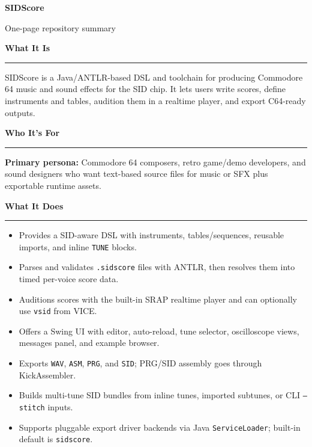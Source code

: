 \documentclass[11pt,a4paper]{article}
\newenvironment{tightitemize}
  {\begin{itemize}\setlength{\itemsep}{2pt}\setlength{\parskip}{0pt}\setlength{\parsep}{0pt}\setlength{\topsep}{2pt}}
  {\end{itemize}}
\newcommand{\sectiontitle}[1]{%
  {\color{MidnightBlue}\large\bfseries #1\par}%
  {\color{MidnightBlue}\rule{\linewidth}{0.8pt}\par}%
  \vspace{2pt}%
}
\begin{document}
\raggedright

{\fontsize{22}{25}\selectfont\bfseries SIDScore\par}
{\color{Gray}\large One-page repository summary\par}
\vspace{6pt}

\sectiontitle{What It Is}
SIDScore is a Java/ANTLR-based DSL and toolchain for producing Commodore 64 music and sound effects for the SID chip. It lets users write scores, define instruments and tables, audition them in a realtime player, and export C64-ready outputs.

\begin{minipage}[t]{0.49\linewidth}
\sectiontitle{Who It's For}
\textbf{Primary persona:} Commodore 64 composers, retro game/demo developers, and sound designers who want text-based source files for music or SFX plus exportable runtime assets.

\sectiontitle{What It Does}
\begin{tightitemize}
\item Provides a SID-aware DSL with instruments, tables/sequences, reusable imports, and inline \texttt{TUNE} blocks.
\item Parses and validates \texttt{.sidscore} files with ANTLR, then resolves them into timed per-voice score data.
\item Auditions scores with the built-in SRAP realtime player and can optionally use \texttt{vsid} from VICE.
\item Offers a Swing UI with editor, auto-reload, tune selector, oscilloscope views, messages panel, and example browser.
\item Exports \texttt{WAV}, \texttt{ASM}, \texttt{PRG}, and \texttt{SID}; PRG/SID assembly goes through KickAssembler.
\item Builds multi-tune SID bundles from inline tunes, imported subtunes, or CLI \texttt{--stitch} inputs.
\item Supports pluggable export driver backends via Java \texttt{ServiceLoader}; built-in default is \texttt{sidscore}.
\end{tightitemize}
\end{minipage}\hfill
\end{document}
